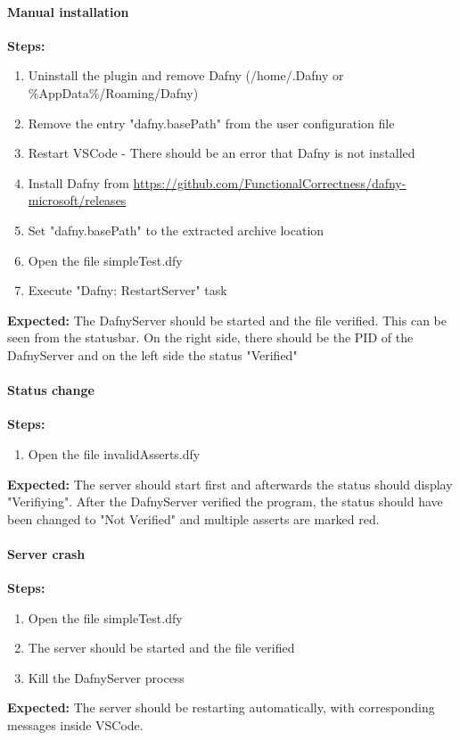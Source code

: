 \paragraph{Manual installation}
\textbf{\newline Steps:}
\begin{enumerate}
\item Uninstall the plugin and remove Dafny (/home/.Dafny or \%AppData\%/Roaming/Dafny)
\item Remove the entry "dafny.basePath" from the user configuration file 
\item Restart VSCode - There should be an error that Dafny is not installed
\item Install Dafny from \href{https://github.com/FunctionalCorrectness/dafny-microsoft/releases}{https://github.com/FunctionalCorrectness/dafny-microsoft/releases}
\item Set "dafny.basePath" to the extracted archive location
\item Open the file simpleTest.dfy
\item Execute "Dafny: RestartServer" task
\end{enumerate}
\textbf{\newline Expected:}
The DafnyServer should be started and the file verified. This can be seen from the statusbar. On the right side, there should be the PID of the DafnyServer and on the left side the status "Verified"

\paragraph{Status change}
\textbf{\newline Steps:}
\begin{enumerate}
	\item Open the file invalidAsserts.dfy

\end{enumerate}
\textbf{\newline Expected:}
The server should start first and afterwards the status should display "Verifiying". After the DafnyServer verified the program, the status should have been changed to "Not Verified" and multiple asserts are marked red. 

\paragraph{Server crash}
\textbf{\newline Steps:}
\begin{enumerate}
	\item Open the file simpleTest.dfy
	\item The server should be started and the file verified
	\item Kill the DafnyServer process
	
\end{enumerate}
\textbf{\newline Expected:}
The server should be restarting automatically, with corresponding messages inside VSCode. 


